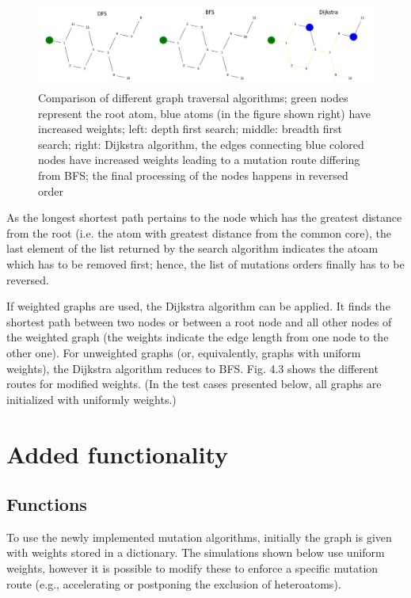 \begin{figure}

\includegraphics[scale=0.45]{dfs_bfs_dijkstra_comp1}\caption{Comparison of different graph traversal algorithms; green nodes represent the root atom, blue atoms (in the figure shown right) have increased weights; left: depth first
search; middle: breadth first search; right: Dijkstra algorithm, the
edges connecting blue colored nodes have increased weights leading
to a mutation route differing from BFS; the final processing of the
nodes happens in reversed order}

\end{figure}

As the longest shortest path pertains to the node which has the greatest
distance from the root (i.e. the atom with greatest distance from
the common core), the last element of the list returned by the search algorithm indicates the atoam which has to be removed first; hence, the list of mutations orders finally has to be reversed.

If weighted graphs are used, the Dijkstra algorithm can be applied.
It finds the shortest path between two nodes or between a root node
and all other nodes of the weighted graph (the weights indicate the
edge length from one node to the other one). For unweighted graphs
(or, equivalently, graphs with uniform weights), the Dijkstra algorithm
reduces to BFS. Fig. 4.3 shows the different routes for modified weights.
(In the test cases presented below, all graphs are initialized with uniformly weights.)

\section{Added functionality}

\subsection{Functions}

To use the newly implemented mutation algorithms, initially the graph
is given with weights stored in a dictionary. The simulations shown
below use uniform weights, however it is possible to modify these to
enforce a specific mutation route (e.g., accelerating or postponing
the exclusion of heteroatoms). 

